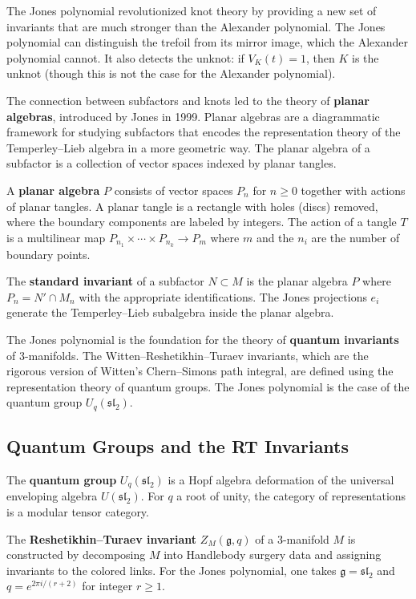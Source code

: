 The Jones polynomial revolutionized knot theory by providing a new set of invariants that are much stronger than the Alexander polynomial. The Jones polynomial can distinguish the trefoil from its mirror image, which the Alexander polynomial cannot. It also detects the unknot: if $V_K(t) = 1$, then $K$ is the unknot (though this is not the case for the Alexander polynomial).

The connection between subfactors and knots led to the theory of \textbf{planar algebras}, introduced by Jones in 1999. Planar algebras are a diagrammatic framework for studying subfactors that encodes the representation theory of the Temperley--Lieb algebra in a more geometric way. The planar algebra of a subfactor is a collection of vector spaces indexed by planar tangles.

A \textbf{planar algebra} $P$ consists of vector spaces $P_n$ for $n \geq 0$ together with actions of planar tangles. A planar tangle is a rectangle with holes (discs) removed, where the boundary components are labeled by integers. The action of a tangle $T$ is a multilinear map $P_{n_1} \times \cdots \times P_{n_k} \to P_m$ where $m$ and the $n_i$ are the number of boundary points.

The \textbf{standard invariant} of a subfactor $N \subset M$ is the planar algebra $P$ where $P_n = N' \cap M_n$ with the appropriate identifications. The Jones projections $e_i$ generate the Temperley--Lieb subalgebra inside the planar algebra.

The Jones polynomial is the foundation for the theory of \textbf{quantum invariants} of 3-manifolds. The Witten--Reshetikhin--Turaev invariants, which are the rigorous version of Witten's Chern--Simons path integral, are defined using the representation theory of quantum groups. The Jones polynomial is the case of the quantum group $U_q(\mathfrak{sl}_2)$.

\subsection*{Quantum Groups and the RT Invariants}

The \textbf{quantum group} $U_q(\mathfrak{sl}_2)$ is a Hopf algebra deformation of the universal enveloping algebra $U(\mathfrak{sl}_2)$. For $q$ a root of unity, the category of representations is a modular tensor category.

The \textbf{Reshetikhin--Turaev invariant} $Z_M(\mathfrak{g}, q)$ of a 3-manifold $M$ is constructed by decomposing $M$ into Handlebody surgery data and assigning invariants to the colored links. For the Jones polynomial, one takes $\mathfrak{g} = \mathfrak{sl}_2$ and $q = e^{2\pi i/(r+2)}$ for integer $r \geq 1$.

